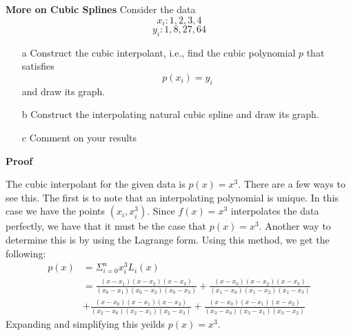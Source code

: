 \textbf{More on Cubic Splines} Consider the data $$x_i : 1, 2, 3, 4$$ $$y_i : 1, 8, 27, 64$$

\begin{itemize}
\item[a] Construct the cubic interpolant, i.e., find the cubic polynomial $p$ that satisfies $$p(x_i) = y_i$$ and draw its graph.
\item[b] Construct the interpolating natural cubic spline and draw its graph.
\item[c] Comment on your results
\end{itemize}

\textbf{Proof}

The cubic interpolant for the given data is $p(x) = x^3$. There are a few ways to see this. The first is to note that an interpolating polynomial is unique. In this case we have the points $(x_i, x_i^3)$. Since $f(x) = x^3$ interpolates the data perfectly, we have that it must be the case that $p(x) = x^3$. Another way to determine this is by using the Lagrange form. Using this method, we get the following:
\begin{align*}
p(x) &= \Sigma_{i = 0}^n x_i^3 L_i(x) \\
&= \frac{(x - x_1)(x - x_2)(x - x_3)}{(x_0 - x_1)(x_0 - x_2)(x_0 - x_3)} 
+ \frac{(x - x_0)(x - x_2)(x - x_3)}{(x_1 - x_0)(x_1 - x_2)(x_1 - x_3)} \\
&+ \frac{(x - x_0)(x - x_1)(x - x_3)}{(x_2 - x_0)(x_2 - x_1)(x_2 - x_3)}
+ \frac{(x - x_0)(x - x_1)(x - x_2)}{(x_3 - x_0)(x_3 - x_1)(x_3 - x_2)}
\end{align*}
Expanding and simplifying this yeilds $p(x) = x^3$.